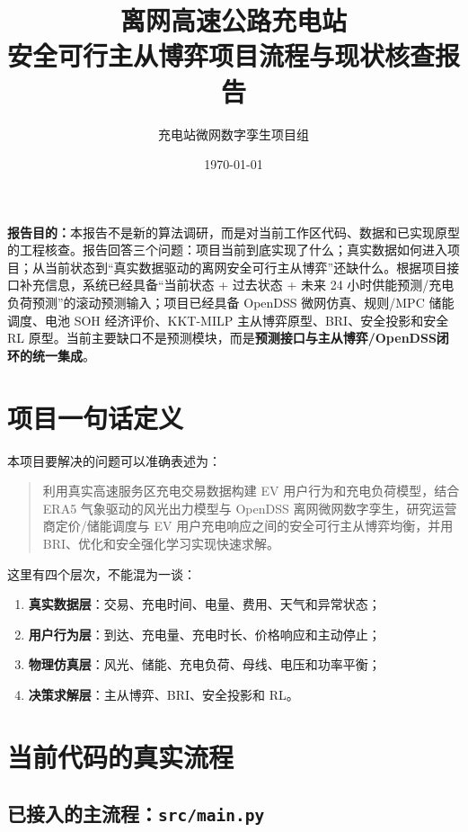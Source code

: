 \documentclass[UTF8,a4paper,11pt]{ctexart}
\title{\vspace{-1.4cm}\textbf{\color{mainblue}离网高速公路充电站\\安全可行主从博弈项目流程与现状核查报告}}
\author{充电站微网数字孪生项目组}
\date{\today}
\begin{document}
\sloppy
\maketitle
\thispagestyle{fancy}

\begin{center}
\begin{minipage}{0.93\textwidth}
\small
\textbf{报告目的：}本报告不是新的算法调研，而是对当前工作区代码、数据和已实现原型的工程核查。报告回答三个问题：项目当前到底实现了什么；真实数据如何进入项目；从当前状态到“真实数据驱动的离网安全可行主从博弈”还缺什么。根据项目接口补充信息，系统已经具备“当前状态 + 过去状态 + 未来 24 小时供能预测/充电负荷预测”的滚动预测输入；项目已经具备 OpenDSS 微网仿真、规则/MPC 储能调度、电池 SOH 经济评价、KKT-MILP 主从博弈原型、BRI、安全投影和安全 RL 原型。当前主要缺口不是预测模块，而是\textbf{预测接口与主从博弈/OpenDSS闭环的统一集成}。
\end{minipage}
\end{center}

\section{项目一句话定义}

本项目要解决的问题可以准确表述为：

\begin{quote}
利用真实高速服务区充电交易数据构建 EV 用户行为和充电负荷模型，结合 ERA5 气象驱动的风光出力模型与 OpenDSS 离网微网数字孪生，研究运营商定价/储能调度与 EV 用户充电响应之间的安全可行主从博弈均衡，并用 BRI、优化和安全强化学习实现快速求解。
\end{quote}

这里有四个层次，不能混为一谈：
\begin{enumerate}
  \item \textbf{真实数据层}：交易、充电时间、电量、费用、天气和异常状态；
  \item \textbf{用户行为层}：到达、充电量、充电时长、价格响应和主动停止；
  \item \textbf{物理仿真层}：风光、储能、充电负荷、母线、电压和功率平衡；
  \item \textbf{决策求解层}：主从博弈、BRI、安全投影和 RL。
\end{enumerate}

\section{当前代码的真实流程}

\subsection{已接入的主流程：\texttt{src/main.py}}
\end{document}
